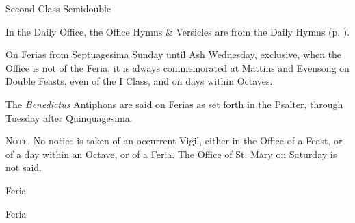 

\begin{multicols}{2}

\begin{inhead}
    {Second Class Semidouble}
\end{inhead}

\begin{rubric}
	In the Daily Office, the Office Hymns \& Versicles are from the Daily Hymns (p. \pageref{DailyHymns}).
\end{rubric}

\begin{rubric}
On Ferias from Septuagesima Sunday until Ash Wednesday, exclusive, when the Office is not of the Feria, it is always commemorated at Mattins and Evensong on Double Feasts, even of the I Class, and on days within Octaves.
\end{rubric}
\begin{rubric}
	The \emph{Benedictus} Antiphons are said on Ferias as set forth in the Psalter, through Tuesday after Quinquagesima.
\end{rubric}
\begin{rubric}
	\textsc{Note,} No notice is taken of an occurrent Vigil, either in the Office of a Feast, or of a day within an Octave, or of a Feria. The Office of St. Mary on Saturday is not said.
\end{rubric}


\begin{inhead}
    {Feria}
\end{inhead}



\begin{inhead}
    {Feria}
\end{inhead}




\end{multicols}
